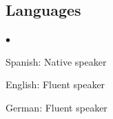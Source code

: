 \documentclass[margin,line]{res}
\newenvironment{list2}{
  \begin{list}{$\bullet$}{%
      \setlength{\itemsep}{0in}
      \setlength{\parsep}{0in} \setlength{\parskip}{0in}
      \setlength{\topsep}{0in} \setlength{\partopsep}{0in} 
      \setlength{\leftmargin}{0.2in}}}{\end{list}}
\begin{document}
\begin{resume}
\section{\sc Languages}
  \begin{list2}
    \item Spanish: Native speaker
    \item English: Fluent speaker
    \item German: Fluent speaker
  \end{list2}

\end{resume}
\end{document}
